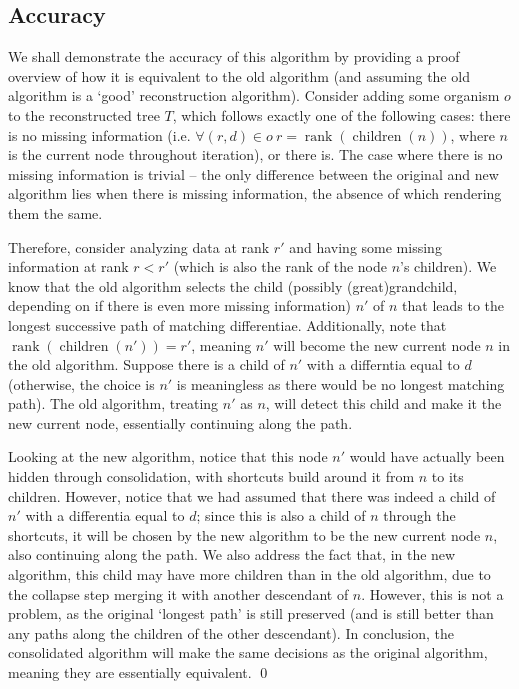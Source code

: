 \subsection{Accuracy}

We shall demonstrate the accuracy of this algorithm by providing a proof overview of how it is equivalent to the old algorithm (and assuming the old algorithm is a `good' reconstruction algorithm). Consider adding some organism $o$ to the reconstructed tree $T$, which follows exactly one of the following cases: there is no missing information (i.e. $\forall (r, d) \in o\ r = \operatorname{rank}(\operatorname{children}(n))$, where $n$ is the current node throughout iteration), or there is. The case where there is no missing information is trivial -- the only difference between the original and new algorithm lies when there is missing information, the absence of which rendering them the same. 

Therefore, consider analyzing data at rank $r'$ and having some missing information at rank $r < r'$ (which is also the rank of the node $n$'s children). We know that the old algorithm selects the child (possibly (great)grandchild, depending on if there is even more missing information) $n'$ of $n$ that leads to the longest successive path of matching differentiae. Additionally, note that $\operatorname{rank}(\operatorname{children}(n')) = r'$, meaning $n'$ will become the new current node $n$ in the old algorithm. Suppose there is a child of $n'$ with a differntia equal to $d$ (otherwise, the choice is $n'$ is meaningless as there would be no longest matching path). The old algorithm, treating $n'$ as $n$, will detect this child and make it the new current node, essentially continuing along the path. 

Looking at the new algorithm, notice that this node $n'$ would have actually been hidden through consolidation, with shortcuts build around it from $n$ to its children. However, notice that we had assumed that there was indeed a child of $n'$ with a differentia equal to $d$; since this is also a child of $n$ through the shortcuts, it will be chosen by the new algorithm to be the new current node $n$, also continuing along the path. We also address the fact that, in the new algorithm, this child may have more children than in the old algorithm, due to the collapse step merging it with another descendant of $n$. However, this is not a problem, as the original `longest path' is still preserved (and is still better than any paths along the children of the other descendant). In conclusion, the consolidated algorithm will make the same decisions as the original algorithm, meaning they are essentially equivalent. \qed

